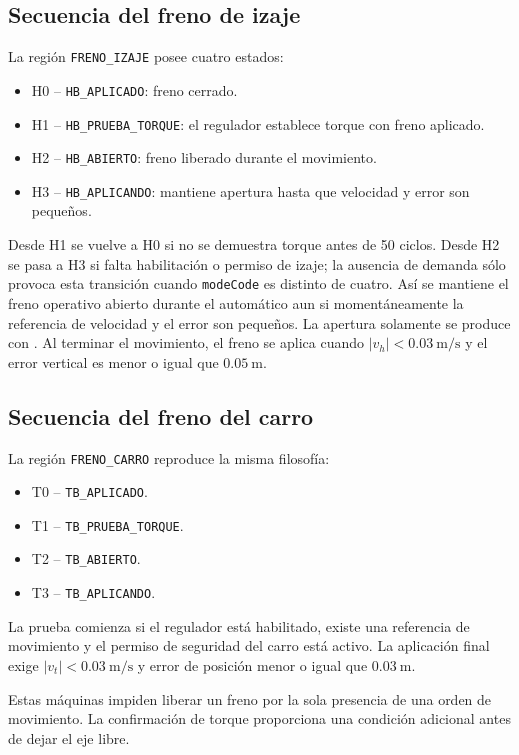 \documentclass[a4paper,10pt,onecolumn,journal]{ieeeconf}
\numberwithin{equation}{section}
\begin{document}
\subsection{Secuencia del freno de izaje}
La región \texttt{FRENO\_IZAJE} posee cuatro estados:
\begin{itemize}
    \item H0 -- \texttt{HB\_APLICADO}: freno cerrado.
    \item H1 -- \texttt{HB\_PRUEBA\_TORQUE}: el regulador establece torque con freno aplicado.
    \item H2 -- \texttt{HB\_ABIERTO}: freno liberado durante el movimiento.
    \item H3 -- \texttt{HB\_APLICANDO}: mantiene apertura hasta que velocidad y error son pequeños.
\end{itemize}
Desde H1 se vuelve a H0 si no se demuestra torque antes de 50 ciclos. Desde H2 se pasa a H3 si falta habilitación o permiso de izaje; la ausencia de demanda sólo provoca esta transición cuando \texttt{modeCode} es distinto de cuatro. Así se mantiene el freno operativo abierto durante el automático aun si momentáneamente la referencia de velocidad y el error son pequeños. La apertura solamente se produce con . Al terminar el movimiento, el freno se aplica cuando $|v_h|<0.03~\mathrm{m/s}$ y el error vertical es menor o igual que $0.05~\mathrm{m}$.


\subsection{Secuencia del freno del carro}
La región \texttt{FRENO\_CARRO} reproduce la misma filosofía:
\begin{itemize}
    \item T0 -- \texttt{TB\_APLICADO}.
    \item T1 -- \texttt{TB\_PRUEBA\_TORQUE}.
    \item T2 -- \texttt{TB\_ABIERTO}.
    \item T3 -- \texttt{TB\_APLICANDO}.
\end{itemize}
La prueba comienza si el regulador está habilitado, existe una referencia de movimiento y el permiso de seguridad del carro está activo. La aplicación final exige $|v_t|<0.03~\mathrm{m/s}$ y error de posición menor o igual que $0.03~\mathrm{m}$.

Estas máquinas impiden liberar un freno por la sola presencia de una orden de movimiento. La confirmación de torque proporciona una condición adicional antes de dejar el eje libre.
\end{document}
